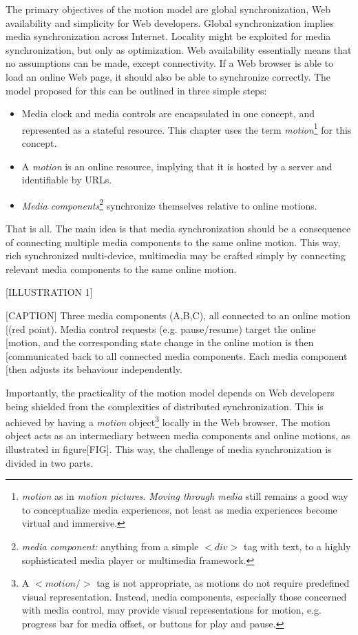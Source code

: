 The primary objectives of the motion model are global synchronization, Web
availability and simplicity for Web developers. Global synchronization implies
media synchronization across Internet. Locality might be exploited for media
synchronization, but only as optimization. Web availability essentially means
that no assumptions can be made, except connectivity. If a Web browser is able
to load an online Web page, it should also be able to synchronize correctly.
The model proposed for this can be outlined in three simple steps:

\begin{itemize}
\item{Media clock and media controls are encapsulated in one concept, and
represented as a stateful resource. This chapter uses the term \emph{motion}\footnote{\emph{motion} as in \emph{motion pictures}. \emph{Moving through media} still remains a good way to conceptualize media experiences, not least as media experiences become virtual and immersive.
} for this
concept.} 
\item{A \emph{motion} is an online resource, implying that it is hosted by a
server and identifiable by URLs.}
\item{\emph{Media components}\footnote{\emph{media component:} anything from a simple $<div>$ tag with text, to a highly sophisticated media player or multimedia framework.
} synchronize themselves relative to online motions.}
\end{itemize}

That is all. The main idea is that media synchronization should be a
consequence of connecting multiple media components to the same online motion.
This way, rich synchronized multi-device, multimedia may be crafted simply by
connecting relevant media components to the same online motion.

[ILLUSTRATION 1]

[CAPTION] Three media components (A,B,C), all connected to an online motion
[(red point). Media control requests (e.g. pause/resume) target the online
[motion, and the corresponding state change in the online motion is then
[communicated back to all connected media components. Each media component
[then adjusts its behaviour independently.

Importantly, the practicality of the motion model depends on Web developers
being shielded from the complexities of distributed synchronization. This is
achieved by having a \emph{motion} object\footnote{ A $<motion/>$ tag is not
appropriate, as motions do not require predefined visual representation.
Instead, media components, especially those concerned with media control, may
provide visual representations for motion, e.g. progress bar for media offset,
or buttons for play and pause. } locally in the Web browser. The motion object
acts as an intermediary between media components and online motions, as
illustrated in figure[FIG]. This way, the challenge of media synchronization
is divided in two parts.

